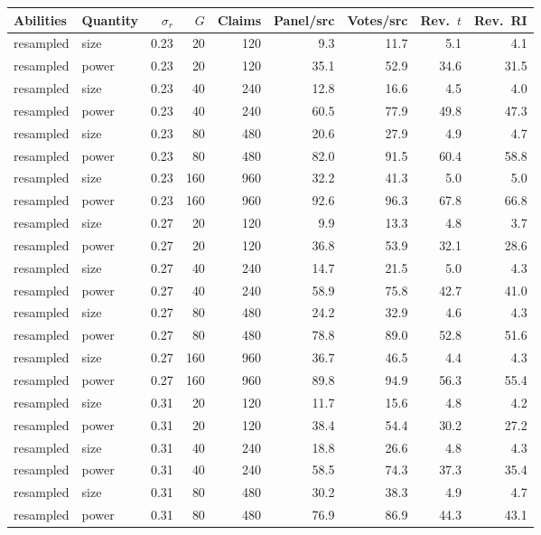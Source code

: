 \begin{table}[p]
\centering\scriptsize
\setlength{\tabcolsep}{4pt}
\begin{tabular}{@{}llrrrrrrr@{}}
\toprule
Abilities & Quantity & $\sigma_r$ & $G$ & Claims & Panel/src & Votes/src & Rev.\ $t$ & Rev.\ RI \\
\midrule
resampled & size & 0.23 & 20 & 120 & 9.3 & 11.7 & 5.1 & 4.1 \\
resampled & power & 0.23 & 20 & 120 & 35.1 & 52.9 & 34.6 & 31.5 \\
resampled & size & 0.23 & 40 & 240 & 12.8 & 16.6 & 4.5 & 4.0 \\
resampled & power & 0.23 & 40 & 240 & 60.5 & 77.9 & 49.8 & 47.3 \\
resampled & size & 0.23 & 80 & 480 & 20.6 & 27.9 & 4.9 & 4.7 \\
resampled & power & 0.23 & 80 & 480 & 82.0 & 91.5 & 60.4 & 58.8 \\
resampled & size & 0.23 & 160 & 960 & 32.2 & 41.3 & 5.0 & 5.0 \\
resampled & power & 0.23 & 160 & 960 & 92.6 & 96.3 & 67.8 & 66.8 \\
resampled & size & 0.27 & 20 & 120 & 9.9 & 13.3 & 4.8 & 3.7 \\
resampled & power & 0.27 & 20 & 120 & 36.8 & 53.9 & 32.1 & 28.6 \\
resampled & size & 0.27 & 40 & 240 & 14.7 & 21.5 & 5.0 & 4.3 \\
resampled & power & 0.27 & 40 & 240 & 58.9 & 75.8 & 42.7 & 41.0 \\
resampled & size & 0.27 & 80 & 480 & 24.2 & 32.9 & 4.6 & 4.3 \\
resampled & power & 0.27 & 80 & 480 & 78.8 & 89.0 & 52.8 & 51.6 \\
resampled & size & 0.27 & 160 & 960 & 36.7 & 46.5 & 4.4 & 4.3 \\
resampled & power & 0.27 & 160 & 960 & 89.8 & 94.9 & 56.3 & 55.4 \\
resampled & size & 0.31 & 20 & 120 & 11.7 & 15.6 & 4.8 & 4.2 \\
resampled & power & 0.31 & 20 & 120 & 38.4 & 54.4 & 30.2 & 27.2 \\
resampled & size & 0.31 & 40 & 240 & 18.8 & 26.6 & 4.8 & 4.3 \\
resampled & power & 0.31 & 40 & 240 & 58.5 & 74.3 & 37.3 & 35.4 \\
resampled & size & 0.31 & 80 & 480 & 30.2 & 38.3 & 4.9 & 4.7 \\
resampled & power & 0.31 & 80 & 480 & 76.9 & 86.9 & 44.3 & 43.1 \\

\end{tabular}
\end{table}
